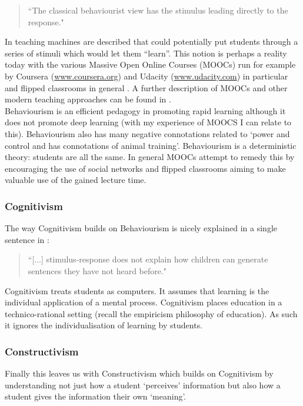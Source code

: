 \documentclass[a4paper,12pt]{article}
\begin{document}
\begin{quote}
    ``The classical behaviourist view has the stimulus leading directly to the response."
\end{quote}

In \cite{Skinner1961a} teaching machines are described that could potentially put students through a series of stimuli which would let them ``learn''. This notion is perhaps a reality today with the various Massive Open Online Courses (MOOCs) run for example by Coursera (\url{www.coursera.org}) and Udacity (\url{www.udacity.com}) in particular and flipped classrooms in general \cite{Bates,JeremyF.Strayer2007,Mccombs2007}. A further description of MOOCs and other modern teaching approaches can be found in \cite{Sharples2012}.\\

Behaviourism is an efficient pedagogy in promoting rapid learning although it does not promote deep learning (with my experience of MOOCS I can relate to this). Behaviourism also has many negative connotations related to `power and control and has connotations of animal training'.  Behaviourism is a deterministic theory: students are all the same. In general MOOCs attempt to remedy this by encouraging the use of social networks and flipped classrooms aiming to make valuable use of the gained lecture time.\\

\subsubsection{Cognitivism}

The way Cognitivism builds on Behaviourism is nicely explained in a single sentence in \cite{Jordan2008a}:

\begin{quote}
    ``[...] stimulus-response does not explain how children can generate sentences they have not heard before."
\end{quote}

Cognitivism treats students as computers. It assumes that learning is the individual application of a mental process. Cognitivism places education in a technico-rational setting (recall the empiricism philosophy of education). As such it ignores the individualisation of learning by students.\\

\subsubsection{Constructivism}
Finally this leaves us with Constructivism which builds on Cognitivism by understanding not just how a student `perceives' information but also how a student gives the information their own `meaning'.\\
\end{document}
